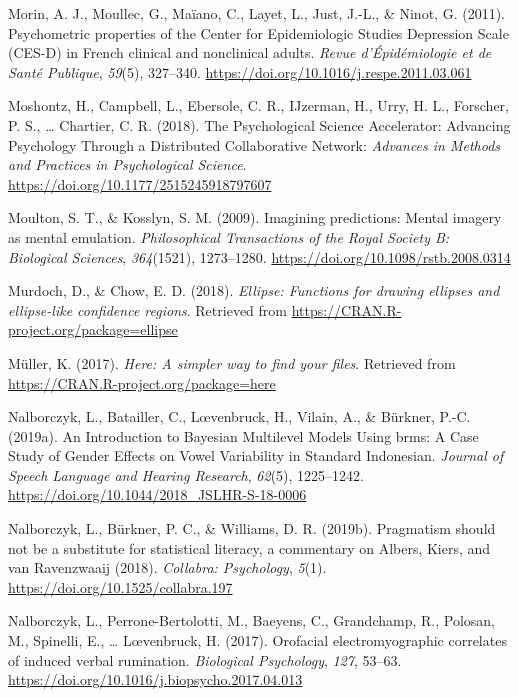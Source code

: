 \documentclass[a4paper,12pt,twoside,openright,oldfontcommands,final]{memoir}
\begin{document}
\leavevmode\hypertarget{ref-morin_psychometric_2011}{}%
Morin, A. J., Moullec, G., Maïano, C., Layet, L., Just, J.-L., \& Ninot, G. (2011). Psychometric properties of the Center for Epidemiologic Studies Depression Scale (CES-D) in French clinical and nonclinical adults. \emph{Revue d'Épidémiologie et de Santé Publique}, \emph{59}(5), 327--340. \url{https://doi.org/10.1016/j.respe.2011.03.061}

\leavevmode\hypertarget{ref-moshontz_psychological_2018}{}%
Moshontz, H., Campbell, L., Ebersole, C. R., IJzerman, H., Urry, H. L., Forscher, P. S., \ldots{} Chartier, C. R. (2018). The Psychological Science Accelerator: Advancing Psychology Through a Distributed Collaborative Network: \emph{Advances in Methods and Practices in Psychological Science}. \url{https://doi.org/10.1177/2515245918797607}

\leavevmode\hypertarget{ref-moulton_imagining_2009}{}%
Moulton, S. T., \& Kosslyn, S. M. (2009). Imagining predictions: Mental imagery as mental emulation. \emph{Philosophical Transactions of the Royal Society B: Biological Sciences}, \emph{364}(1521), 1273--1280. \url{https://doi.org/10.1098/rstb.2008.0314}

\leavevmode\hypertarget{ref-R-ellipse}{}%
Murdoch, D., \& Chow, E. D. (2018). \emph{Ellipse: Functions for drawing ellipses and ellipse-like confidence regions}. Retrieved from \url{https://CRAN.R-project.org/package=ellipse}

\leavevmode\hypertarget{ref-R-here}{}%
Müller, K. (2017). \emph{Here: A simpler way to find your files}. Retrieved from \url{https://CRAN.R-project.org/package=here}

\leavevmode\hypertarget{ref-nalborczyk_introduction_2019}{}%
Nalborczyk, L., Batailler, C., Lœvenbruck, H., Vilain, A., \& Bürkner, P.-C. (2019a). An Introduction to Bayesian Multilevel Models Using brms: A Case Study of Gender Effects on Vowel Variability in Standard Indonesian. \emph{Journal of Speech Language and Hearing Research}, \emph{62}(5), 1225--1242. \url{https://doi.org/10.1044/2018_JSLHR-S-18-0006}

\leavevmode\hypertarget{ref-nalborczyk_pragmatism_2019}{}%
Nalborczyk, L., Bürkner, P. C., \& Williams, D. R. (2019b). Pragmatism should not be a substitute for statistical literacy, a commentary on Albers, Kiers, and van Ravenzwaaij (2018). \emph{Collabra: Psychology}, \emph{5}(1). \url{https://doi.org/10.1525/collabra.197}

\leavevmode\hypertarget{ref-nalborczyk_orofacial_2017}{}%
Nalborczyk, L., Perrone-Bertolotti, M., Baeyens, C., Grandchamp, R., Polosan, M., Spinelli, E., \ldots{} Lœvenbruck, H. (2017). Orofacial electromyographic correlates of induced verbal rumination. \emph{Biological Psychology}, \emph{127}, 53--63. \url{https://doi.org/10.1016/j.biopsycho.2017.04.013}
\end{document}

